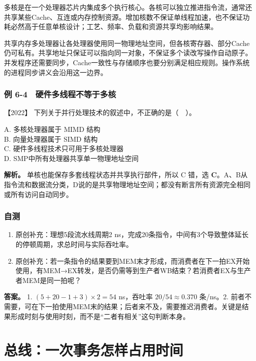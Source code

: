 多核是在一个处理器芯片内集成多个执行核心。各核可以独立推进指令流，通常还共享某些Cache、互连或内存控制资源。增加核数不保证单线程加速，也不保证功耗必然高于任意单核设计；工艺、频率、负载和资源共享均影响结果。

共享内存多处理器让各处理器使用同一物理地址空间，但各核寄存器、部分Cache仍可私有。共享地址只保证可以指向同一对象，不保证多个读改写操作自动原子。并发程序还需要同步，Cache一致性与存储顺序也要分别满足相应规则。操作系统的进程同步讲义会沿用这一边界。

\subsection{例 6-4　硬件多线程不等于多核}\label{co-ex6-4}

\noindent{}【2022】 下列关于并行处理技术的叙述中，不正确的是（　）。

A. 多核处理器属于 MIMD 结构\\
B. 向量处理器属于 SIMD 结构\\
C. 硬件多线程技术只可用于多核处理器\\
D. SMP中所有处理器共享单一物理地址空间


\textbf{解析。} 单核也能保存多套线程状态并共享执行部件，所以 C 错，选 \textbf{C}。A、B从指令流和数据流分类，D说的是共享物理地址空间；都没有断言所有资源完全相同或所有访问自动同步。

\subsection{自测}\label{co-self6}

\begin{enumerate}
\def\labelenumi{\arabic{enumi}.}
\tightlist
\item
  原创补充：理想5段流水线周期2 ns，完成20条指令，中间有3个导致整体延长的停顿周期，求总时间与实际吞吐率。
\item
  原创补充：若一条指令的结果要到MEM末才形成，而消费者在下一拍EX开始使用，有MEM→EX转发，是否仍需等到生产者WB结束？若消费者EX与生产者MEM是同一拍呢？
\end{enumerate}

\textbf{答案。} 1. \((5+20-1+3)\times2=54\) ns，吞吐率 \(20/54\approx0.370\) 条/ns。2. 前者不需要，可在下一拍使用MEM末的结果；后者来不及，需要推迟消费者。关键是结果形成时刻与使用时刻，而不是``二者有相关''这句判断本身。

\chapter{总线：一次事务怎样占用时间}\label{co-ch7}

